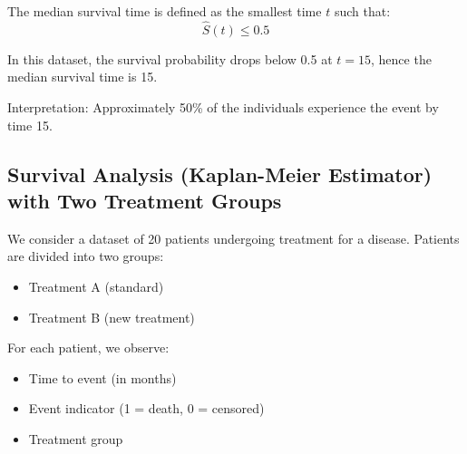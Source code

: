 \documentclass[10pt,a4paper]{article}
\begin{document}
The median survival time is defined as the smallest time $t$ such that:
\[
\hat{S}(t) \leq 0.5
\]

In this dataset, the survival probability drops below 0.5 at $t = 15$, hence the median survival time is 15.

Interpretation: Approximately 50\% of the individuals experience the event by time 15.

\subsection{Survival Analysis (Kaplan-Meier Estimator) with Two Treatment Groups}



We consider a dataset of 20 patients undergoing treatment for a disease. Patients are divided into two groups:

\begin{itemize}
 \item Treatment A (standard)
 \item Treatment B (new treatment)
\end{itemize}

For each patient, we observe:
\begin{itemize}
 \item Time to event (in months)
 \item Event indicator (1 = death, 0 = censored)
 \item Treatment group
\end{itemize}



\begin{center}
\end{center}
\end{document}
